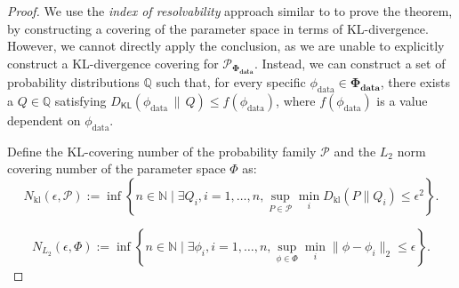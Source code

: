 \documentclass[11pt]{article}
\theoremstyle{plain}
\newtheorem{lemma}[theorem]{Lemma}
\theoremstyle{definition}
\newcommand{\DKL}{D_{\mathsf{KL}}}
\newcommand{\dataModel}{\phi_{\text{data}}}
\newcommand{\synModel}{\phi_{\text{syn}}}
\newcommand{\datafamily}{\mathbf{\Phi_{\text{data}}}}
\newcommand{\dataprobability}{\mathcal{P}_{\boldsymbol{\Phi_{\text{data}}}}}
\begin{document}
\begin{proof} 
We use the {\em index of resolvability} approach 
similar to \citep{barron1991minimum} to prove the theorem, by constructing a covering of the parameter space in terms of 
KL-divergence. 
However, we cannot directly apply the conclusion, as we are unable to explicitly construct a KL-divergence covering for $\dataprobability$. Instead, we can construct a set of probability distributions $\mathbb{Q}$ such that, for every specific $\dataModel \in \datafamily$, there exists a $Q \in \mathbb{Q}$ satisfying $\DKL(\dataModel \,\|\, Q) \leq f(\dataModel)$, where $f(\dataModel)$ is a value dependent on $\dataModel$.



Define the KL-covering number of the probability family $\mathcal{P}$ and the $L_2$ norm covering number of the parameter space $\Phi$ as:
\[
N_{\text{kl}}(\epsilon, \mathcal{P}) := \inf \left\{ n \in \mathbb{N} \mid \exists Q_i, i = 1, \ldots, n, \sup_{P \in \mathcal{P}} \min_i D_{\text{kl}}(P \| Q_i) \leq \epsilon^2 \right\}.
\]






\[
N_{L_2}(\epsilon, \Phi) := \inf \left\{ n \in \mathbb{N} \mid \exists \phi_i, i = 1, \ldots, n, \sup_{\phi \in \Phi} \min_i \|\phi-\phi_i\|_2\le \epsilon \right\}.
\]


\end{proof}
\end{document}
